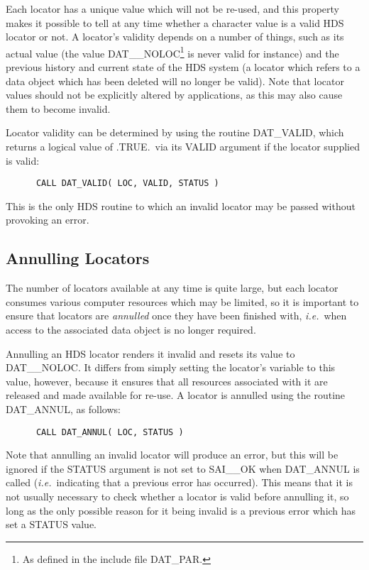 Each locator has a unique value which will not be re-used, and this property
makes it possible to tell at any time whether a character value is a valid HDS
locator or not.  A locator's validity depends on a number of things, such as its
actual value (the value DAT\_\_NOLOC\footnote{As defined in the include file
DAT\_PAR.} is never valid for instance) and the previous history and current
state of the HDS system (a locator which refers to a data object which has
been deleted will no longer be valid).  Note that locator values should not be
explicitly altered by applications, as this may also cause them to become
invalid. 

Locator validity can be determined by using the routine DAT\_VALID, which
returns a logical value of .TRUE.\ via its VALID argument if the locator
supplied is valid: 

\small
\begin{verbatim}
      CALL DAT_VALID( LOC, VALID, STATUS )
\end{verbatim}
\normalsize

This is the only HDS routine to which an invalid locator may be passed without
provoking an error.

\subsection{Annulling Locators}
\label{sect:annul}

The number of locators available at any time is quite large, but each locator
consumes various computer resources which may be limited, so it is important to
ensure that locators are {\em annulled\/} once they have been finished with,
{\em i.e.}\ when access to the associated data object is no longer required. 

Annulling an HDS locator renders it invalid and resets its value to
DAT\_\_NOLOC.  It differs from simply setting the locator's variable to this
value, however, because it ensures that all resources associated with it are
released and made available for re-use. A locator is annulled using the routine
DAT\_ANNUL, as follows:

\small
\begin{verbatim}
      CALL DAT_ANNUL( LOC, STATUS )
\end{verbatim}
\normalsize

Note that annulling an invalid locator will produce an error, but this will be
ignored if the STATUS argument is not set to SAI\_\_OK when DAT\_ANNUL is called
({\em i.e.}\ indicating that a previous error has occurred). This means that it
is not usually necessary to check whether a locator is valid before annulling
it, so long as the only possible reason for it being invalid is a previous error
which has set a STATUS value. 

